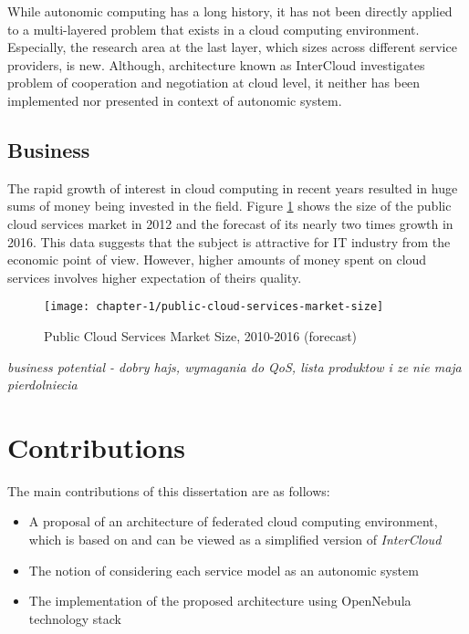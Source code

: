 While autonomic computing has a long history, it has not been directly applied to a multi-layered problem that exists in a cloud computing environment. Especially, the research area at the last layer, which sizes across different service providers, is new. Although, architecture known as InterCloud investigates problem of cooperation and negotiation at cloud level, it neither has been implemented nor presented in context of autonomic system.

\subsection{Business}
The rapid growth of interest in cloud computing in recent years resulted in huge sums of money being invested in the field. Figure \ref{ch1:public-cloud-services-market-size} shows the size of the public cloud services market in 2012 and the forecast of its nearly two times growth in 2016. This data suggests that the subject is attractive for IT industry from the economic point of view. However, higher amounts of money spent on cloud services involves higher expectation of theirs quality.

\begin{figure}[!ht]
  \begin{center}
    \texttt{[image: chapter-1/public-cloud-services-market-size]}
  \end{center}
  \caption{Public Cloud Services Market Size, 2010-2016 (forecast)}
  \label{ch1:public-cloud-services-market-size}
\end{figure}


\textit{business potential - dobry hajs, wymagania do QoS, lista produktow i ze nie maja pierdolniecia}

\section{Contributions}
The main contributions of this dissertation are as follows:
\begin{itemize}
  \item A proposal of an architecture of federated cloud computing environment, which is based on and can be viewed as a simplified version of \emph{InterCloud}
  \item The notion of considering each service model as an autonomic system
  \item The implementation of the proposed architecture using OpenNebula technology stack
\end{itemize}

